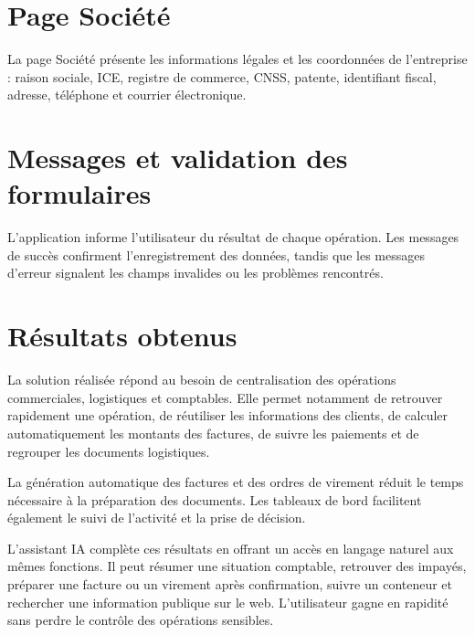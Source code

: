 \documentclass[12pt,a4paper,oneside]{report}
\begin{document}
\section{Page Société}

La page Société présente les informations légales et les coordonnées
de l'entreprise : raison sociale, ICE, registre de commerce, CNSS,
patente, identifiant fiscal, adresse, téléphone et courrier électronique.



\section{Messages et validation des formulaires}

L'application informe l'utilisateur du résultat de chaque opération.
Les messages de succès confirment l'enregistrement des données, tandis
que les messages d'erreur signalent les champs invalides ou les problèmes
rencontrés.



\section{Résultats obtenus}

La solution réalisée répond au besoin de centralisation des opérations
commerciales, logistiques et comptables. Elle permet notamment de
retrouver rapidement une opération, de réutiliser les informations des
clients, de calculer automatiquement les montants des factures, de suivre
les paiements et de regrouper les documents logistiques.

La génération automatique des factures et des ordres de virement réduit
le temps nécessaire à la préparation des documents. Les tableaux de bord
facilitent également le suivi de l'activité et la prise de décision.

L'assistant IA complète ces résultats en offrant un accès en langage
naturel aux mêmes fonctions. Il peut résumer une situation comptable,
retrouver des impayés, préparer une facture ou un virement après
confirmation, suivre un conteneur et rechercher une information publique
sur le web. L'utilisateur gagne en rapidité sans perdre le contrôle des
opérations sensibles.
\end{document}
